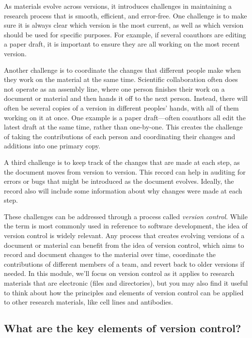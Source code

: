 \documentclass[]{tufte-book}
\begin{document}
As materials evolve across versions, it introduces challenges in maintaining a
research process that is smooth, efficient, and error-free. One challenge is to
make sure it is always clear which version is the most current, as well as which
version should be used for specific purposes. For example, if several coauthors
are editing a paper draft, it is important to ensure they are all working on the
most recent version.

Another challenge is to coordinate the changes that different people make when
they work on the material at the same time. Scientific collaboration often does
not operate as an assembly line, where one person finishes their work on a
document or material and then hands it off to the next person. Instead, there
will often be several copies of a version in different peoples' hands, with all
of them working on it at once. One example is a paper draft---often coauthors
all edit the latest draft at the same time, rather than one-by-one.
This creates the challenge of taking the contributions of each person and
coordinating their changes and additions into one primary copy.

A third challenge is to keep track of the changes that are made at each step, as
the document moves from version to version. This record can help in auditing for
errors or bugs that might be introduced as the document evolves. Ideally, the
record also will include some information about why changes were made at each
step.

These challenges can be addressed through a process called \emph{version control}.
While the term is most commonly used in reference to software development, the
idea of version control is widely relevant. Any process that creates evolving
versions of a document or material can benefit from the idea of version control,
which aims to record and document changes to the material over time, coordinate
the contributions of different members of a team, and revert back to older
versions if needed. In this module, we'll focus on version control as it applies
to research materials that are electronic (files and directories), but you may
also find it useful to think about how the principles and elements of version
control can be applied to other research materials, like cell lines and
antibodies.

\subsection{What are the key elements of version control?}\label{what-are-the-key-elements-of-version-control}
\end{document}
